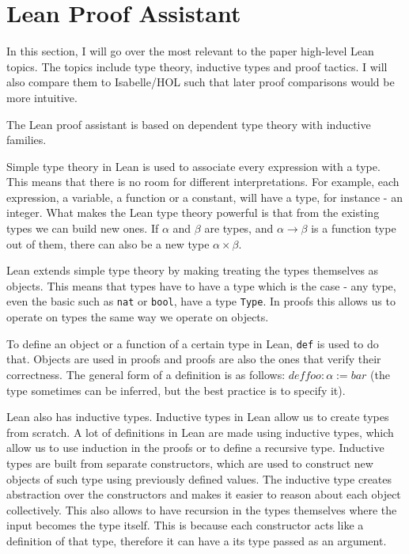 \chapter{Lean Proof Assistant}\label{s:lean}

In this section, I will go over the most relevant to the paper high-level Lean topics. The topics include type theory, inductive types and proof tactics. I will also compare them to Isabelle/HOL such that later proof comparisons would be more intuitive.

The Lean proof assistant is based on dependent type theory with inductive families.

Simple type theory in Lean is used to associate every expression with a type. This means that there is no room for different interpretations. 
For example, each expression, a variable, a function or a constant, will have a type, for instance - an integer. What makes the Lean type theory powerful is that from the existing types we can build new ones. If $\alpha$ and $\beta$ are types, and $\alpha \rightarrow \beta$ is a function type out of them, there can also be a new type $\alpha \times \beta$.

Lean extends simple type theory by making treating the types themselves as objects. This means that types have to have a type which is the case - any type, even the basic such as \lstinline{nat} or \lstinline{bool}, have a type \lstinline{Type}.
In proofs this allows us to operate on types the same way we operate on objects.

To define an object or a function of a certain type in Lean, \lstinline{def} is used to do that. Objects are used in proofs and proofs are also the ones that verify their correctness. The general form of a definition is as follows: $def foo : \alpha := bar$ (the type sometimes can be inferred, but the best practice is to specify it). 

Lean also has inductive types. Inductive types in Lean allow us to create types from scratch. A lot of definitions in Lean are made using inductive types, which allow us to use induction in the proofs or to define a recursive type. Inductive types are built from separate constructors, which are used to construct new objects of such type using previously defined values.
The inductive type creates abstraction over the constructors and makes it easier to reason about each object collectively. This also allows to have recursion in the types themselves where the input becomes the type itself. This is because each constructor acts like a definition of that type, therefore it can have a its type passed as an argument.

